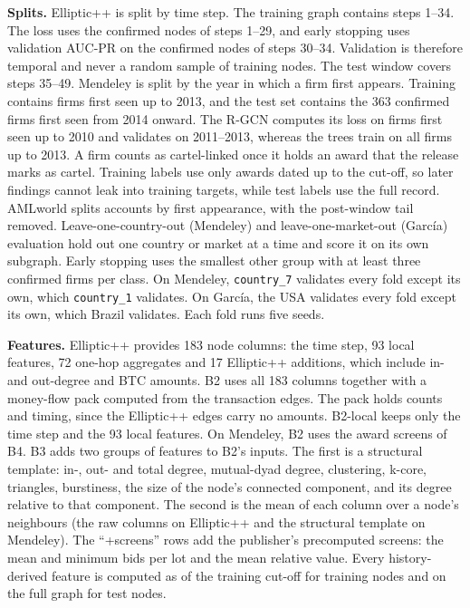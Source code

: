 \documentclass[conference]{IEEEtran}
\begin{document}
\textbf{Splits.} Elliptic++ is split by time step. The training graph contains
steps 1--34. The loss uses the confirmed nodes of steps 1--29, and early
stopping uses validation AUC-PR on the confirmed nodes of steps 30--34.
Validation is therefore temporal and never a random sample of training nodes. The test
window covers steps 35--49. Mendeley is split by the year in which a firm first
appears. Training contains firms first seen up to 2013, and the test set
contains the 363 confirmed firms first seen from 2014 onward. The R-GCN computes
its loss on firms first seen up to 2010 and validates on 2011--2013, whereas the
trees train on all firms up to 2013. A firm counts as cartel-linked once it
holds an award that the release marks as cartel. Training labels use only
awards dated up to the cut-off, so later findings cannot leak into training
targets, while test labels use the full record. AMLworld splits accounts by
first appearance, with the post-window tail removed. Leave-one-country-out
(Mendeley) and leave-one-market-out (Garc\'ia) evaluation hold out one country
or market at a time and score it on its own subgraph. Early stopping uses the
smallest other group with at least three confirmed firms per class. On
Mendeley, \texttt{country\_7} validates every fold except its own, which
\texttt{country\_1} validates. On Garc\'ia, the USA validates every fold
except its own, which Brazil validates. Each fold runs five seeds.

\textbf{Features.} Elliptic++ provides 183 node columns: the time step, 93 local
features, 72 one-hop aggregates and 17 Elliptic++ additions, which include in-
and out-degree and BTC amounts. B2 uses all 183 columns together with a
money-flow pack computed from the transaction edges. The pack holds counts and
timing, since the Elliptic++ edges carry no amounts. B2-local keeps only the
time step and the 93 local features. On Mendeley, B2 uses the award screens of B4. B3 adds
two groups of features to B2's inputs. The first is a structural template: in-,
out- and total degree, mutual-dyad degree, clustering, k-core, triangles,
burstiness, the size of the node's connected component, and its degree relative
to that component. The second is the mean of each column over a node's
neighbours (the raw columns on Elliptic++ and the structural template on
Mendeley). The ``+screens'' rows add the publisher's precomputed screens: the
mean and minimum bids per lot and the mean relative value. Every
history-derived feature is computed as of the training cut-off for training
nodes and on the full graph for test nodes.
\end{document}
